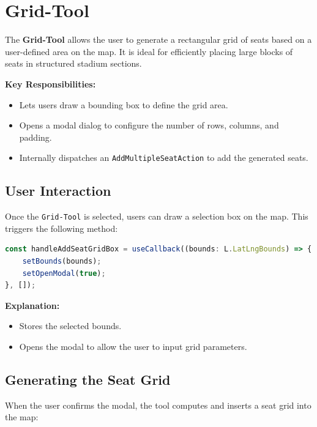 \section{Grid-Tool}

The \textbf{Grid-Tool} allows the user to generate a rectangular grid of seats based on a user-defined area on the map. It is ideal for efficiently placing large blocks of seats in structured stadium sections.

\textbf{Key Responsibilities:}
\begin{itemize}
    \item Lets users draw a bounding box to define the grid area.
    \item Opens a modal dialog to configure the number of rows, columns, and padding.
    \item Internally dispatches an \texttt{AddMultipleSeatAction} to add the generated seats.
\end{itemize}

\subsection{User Interaction}
Once the \texttt{Grid-Tool} is selected, users can draw a selection box on the map. This triggers the following method:

\begin{lstlisting}[language=TypeScript, caption=Handling Box Selection, label=lst:grid-handle-box]
const handleAddSeatGridBox = useCallback((bounds: L.LatLngBounds) => {
    setBounds(bounds);
    setOpenModal(true);
}, []);
\end{lstlisting}

\textbf{Explanation:}
\begin{itemize}
    \item Stores the selected bounds.
    \item Opens the modal to allow the user to input grid parameters.
\end{itemize}

\subsection{Generating the Seat Grid}
When the user confirms the modal, the tool computes and inserts a seat grid into the map:

